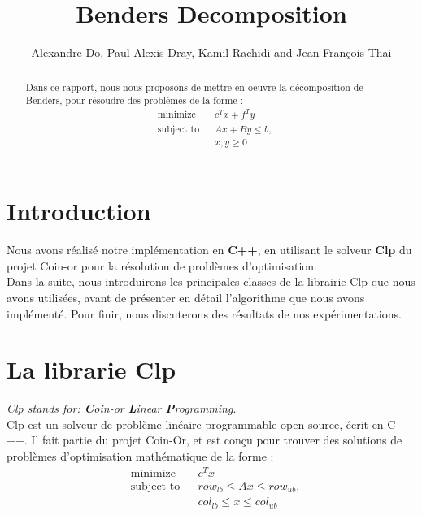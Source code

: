 \documentclass[a4paper]{article}
\title{Benders Decomposition}
\author{Alexandre Do, Paul-Alexis Dray, Kamil Rachidi and Jean-François Thai}
\begin{document}
\maketitle

\begin{abstract}
Dans ce rapport, nous nous proposons de mettre en oeuvre la décomposition de Benders, pour résoudre des problèmes de la forme :
\begin{equation}
\begin{aligned}
& {\text{minimize}}
& & c^{T}x + f^{T}y \\
& \text{subject to}
& & Ax + By \leq b, \\
& & & x, y \geq 0
\end{aligned}
\label{InitialPb}
\end{equation}
\end{abstract}

\section{Introduction}

Nous avons réalisé notre implémentation en \textbf{C++}, en utilisant le solveur \textbf{Clp} du projet Coin-or pour la résolution de problèmes d'optimisation.\\
Dans la suite, nous introduirons les principales classes de la librairie Clp que nous avons utilisées, avant de présenter en détail  l'algorithme que nous avons implémenté. Pour finir, nous discuterons des résultats de nos expérimentations.

\section{La librarie Clp}
\textit{Clp stands for: \textbf{C}oin-or \textbf{L}inear \textbf{P}rogramming}.\\
Clp est un solveur de problème linéaire programmable open-source, écrit en C ++. Il fait partie du projet Coin-Or, et est conçu pour trouver des solutions de problèmes d'optimisation mathématique de la forme  :
\begin{equation}
\begin{aligned}
& {\text{minimize}}
& & c^{T}x \\
& \text{subject to}
& & row_{lb} \leq Ax \leq row_{ub}, \\
& & & col_{lb} \leq x \leq col_{ub}
\end{aligned}
\label{defaultPb}
\end{equation}
\end{document}
